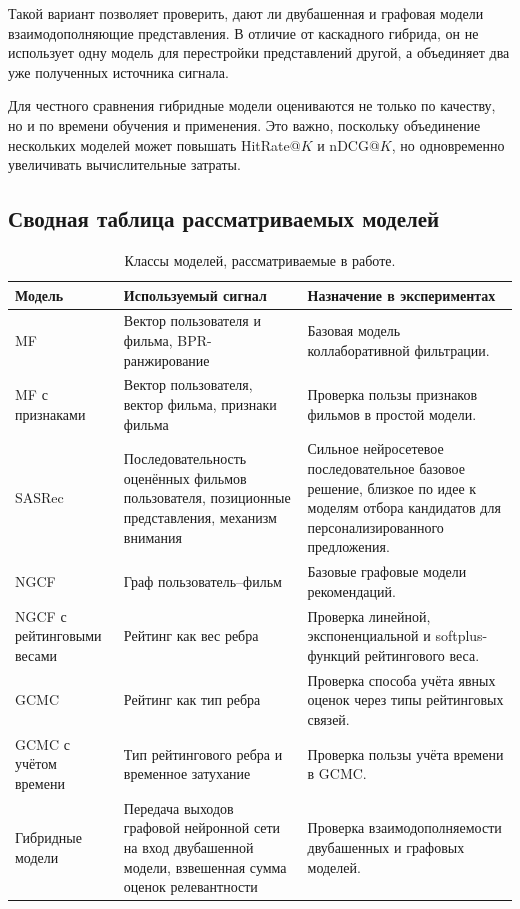 \documentclass[12pt,fleqn]{article}
\begin{document}
Такой вариант позволяет проверить, дают ли двубашенная и графовая модели
взаимодополняющие представления. В отличие от каскадного гибрида, он не
использует одну модель для перестройки представлений другой, а объединяет два
уже полученных источника сигнала.

Для честного сравнения гибридные модели оцениваются не только по качеству, но
и по времени обучения и применения. Это важно, поскольку объединение нескольких
моделей может повышать HitRate@$K$ и nDCG@$K$, но одновременно увеличивать
вычислительные затраты.
\subsection{Сводная таблица рассматриваемых моделей}

\begin{table}[H]
\centering
\caption{Классы моделей, рассматриваемые в работе.}
\label{tab:models_overview}
\begin{tabular}{|p{}|p{}|p{}|}
\hline
\textbf{Модель} &
\textbf{Используемый сигнал} &
\textbf{Назначение в экспериментах} \\
\hline
MF &
Вектор пользователя и фильма, BPR-ранжирование &
Базовая модель коллаборативной фильтрации. \\
\hline
MF с признаками &
Вектор пользователя, вектор фильма, признаки фильма &
Проверка пользы признаков фильмов в простой модели. \\
\hline
SASRec &
Последовательность оценённых фильмов пользователя, позиционные представления, механизм внимания &
Сильное нейросетевое последовательное базовое решение, близкое по идее к моделям отбора кандидатов для персонализированного предложения. \\
\hline
NGCF &
Граф пользователь--фильм &
Базовые графовые модели рекомендаций. \\
\hline
NGCF с рейтинговыми весами &
Рейтинг как вес ребра &
Проверка линейной, экспоненциальной и softplus-функций рейтингового веса. \\
\hline
GCMC &
Рейтинг как тип ребра &
Проверка способа учёта явных оценок через типы рейтинговых связей. \\
\hline
GCMC с учётом времени &
Тип рейтингового ребра и временное затухание &
Проверка пользы учёта времени в GCMC. \\
\hline
Гибридные модели &
Передача выходов графовой нейронной сети на вход двубашенной модели, 
взвешенная сумма оценок релевантности &
Проверка взаимодополняемости двубашенных и графовых моделей. \\
\hline
\end{tabular}
\end{table}
\end{document}
